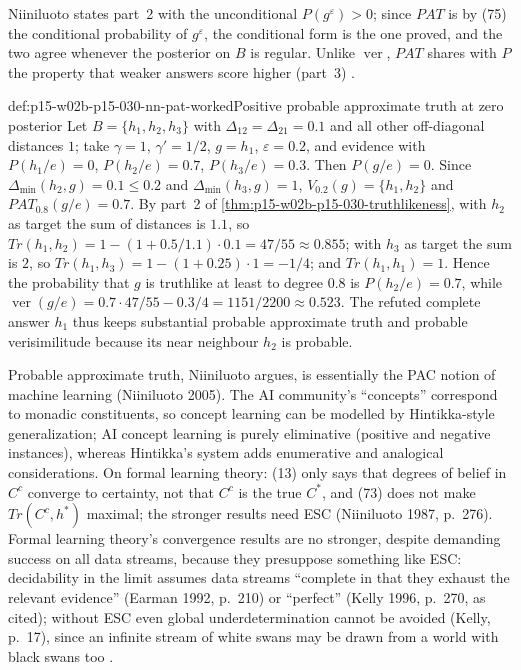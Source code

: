 Niiniluoto states part~2 with the unconditional \(P(g^\varepsilon)>0\); since
\(PAT\) is by (75) the conditional probability of \(g^\varepsilon\), the
conditional form is the one proved, and the two agree whenever the
posterior on \(B\) is regular. Unlike \(\operatorname{ver}\), \(PAT\) shares with
\(P\) the property that weaker answers score higher (part~3)
\cite[p.~347]{Niiniluoto2011HintikkaProgramReading}.

\begin{hbexample}{def:p15-w02b-p15-030-nn-pat-worked}{Positive probable approximate truth at zero posterior}
Let \(B=\{h_1,h_2,h_3\}\) with \(\Delta_{12}=\Delta_{21}=0.1\) and all other
off-diagonal distances \(1\); take \(\gamma=1\), \(\gamma'=1/2\), \(g=h_1\),
\(\varepsilon=0.2\), and evidence with \(P(h_1/e)=0\), \(P(h_2/e)=0.7\),
\(P(h_3/e)=0.3\). Then \(P(g/e)=0\). Since \(\Delta_{\min}(h_2,g)=0.1\leq0.2\)
and \(\Delta_{\min}(h_3,g)=1\), \(V_{0.2}(g)=\{h_1,h_2\}\) and
\(PAT_{0.8}(g/e)=0.7\). By part~2 of
\cref{thm:p15-w02b-p15-030-truthlikeness}, with \(h_2\) as target the sum of
distances is \(1.1\), so \(Tr(h_1,h_2)=1-(1+0.5/1.1)\cdot0.1=47/55\approx0.855\);
with \(h_3\) as target the sum is \(2\), so \(Tr(h_1,h_3)=1-(1+0.25)\cdot1=-1/4\);
and \(Tr(h_1,h_1)=1\). Hence the probability that \(g\) is truthlike at least
to degree \(0.8\) is \(P(h_2/e)=0.7\), while
\(\operatorname{ver}(g/e)=0.7\cdot47/55-0.3/4=1151/2200\approx0.523\).
The refuted complete answer \(h_1\) thus keeps substantial probable
approximate truth and probable verisimilitude because its near neighbour
\(h_2\) is probable.
\end{hbexample}

Probable approximate truth, Niiniluoto argues, is essentially the PAC
notion of machine learning (Niiniluoto 2005). The AI community's
``concepts'' correspond to monadic constituents, so concept learning can
be modelled by Hintikka-style generalization; AI concept learning is
purely eliminative (positive and negative instances), whereas Hintikka's
system adds enumerative and analogical considerations. On formal learning
theory: (13) only says that degrees of belief in \(C^c\) converge to
certainty, not that \(C^c\) is the true \(C^*\), and (73) does not make
\(Tr(C^c,h^*)\) maximal; the stronger results need ESC (Niiniluoto 1987,
p.~276). Formal learning theory's convergence results are no stronger,
despite demanding success on all data streams, because they presuppose
something like ESC: decidability in the limit assumes data streams
``complete in that they exhaust the relevant evidence'' (Earman 1992,
p.~210) or ``perfect'' (Kelly 1996, p.~270, as cited); without ESC even
global underdetermination cannot be avoided (Kelly, p.~17), since an
infinite stream of white swans may be drawn from a world with black swans
too \cite[pp.~347--348]{Niiniluoto2011HintikkaProgramReading}.


